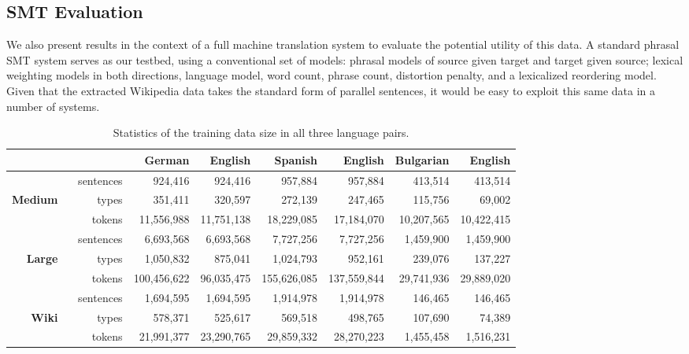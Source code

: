 \subsection{SMT Evaluation}

We also present results in the context of a full machine translation system
to evaluate the potential utility of this data.  A standard
phrasal SMT system \citep{Koehn03} serves as our testbed, using
a conventional set of models: phrasal models of source given target and
target given source; lexical weighting models in both directions, language
model, word count, phrase count, distortion penalty, and a lexicalized
reordering model.  Given that the extracted Wikipedia data takes the
standard form of parallel sentences, it would be easy to exploit this same
data in a number of systems.

\begin{table}[ht]
\tiny
\begin{center}
\begin{tabular}{|rr||r|r||r|r||r|r|}
\hline
      &                & German        & English       & Spanish       & English      & Bulgarian    & English   \\
\hline
      & sentences     & 924,416       & 924,416       & 957,884       & 957,884      & 413,514      & 413,514   \\
\textbf{Medium} \
      & types     & 351,411       & 320,597       & 272,139       & 247,465      & 115,756      & 69,002    \\
      & tokens    & 11,556,988    & 11,751,138    & 18,229,085    & 17,184,070   & 10,207,565   & 10,422,415\\
\hline
      & sentences      & 6,693,568     & 6,693,568     & 7,727,256     & 7,727,256    & 1,459,900    & 1,459,900 \\
\textbf{Large} \
      &      types     & 1,050,832     & 875,041       & 1,024,793     & 952,161      & 239,076      & 137,227   \\
      &      tokens    & 100,456,622   & 96,035,475    & 155,626,085   & 137,559,844  & 29,741,936   & 29,889,020\\
\hline
      & sentences      & 1,694,595     & 1,694,595     & 1,914,978     & 1,914,978    & 146,465      & 146,465   \\
\textbf{Wiki}  \
      &      types     & 578,371       & 525,617       & 569,518       & 498,765      & 107,690      & 74,389    \\
      &      tokens    & 21,991,377    & 23,290,765    & 29,859,332    & 28,270,223   & 1,455,458    & 1,516,231 \\
\hline
\end{tabular}
\end{center}
\caption{Statistics of the training data size in all three language pairs.}
\label{table:mtTrainStats}
\end{table}

